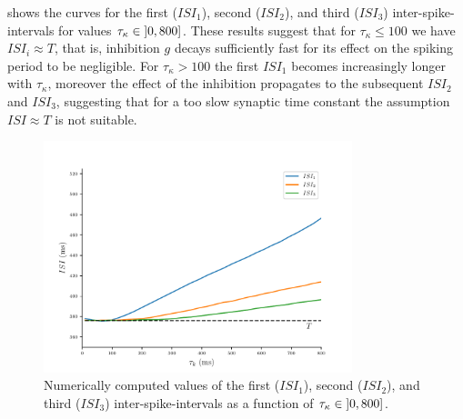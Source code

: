 \documentclass[utf8]{frontiers_suppmat} %
\begin{document}
 shows the curves for the first ($ISI_{1}$), second ($ISI_{2}$), and third ($ISI_{3}$) inter-spike-intervals for values $\tau_{\kappa} \in \interval[open left]{0}{800}$.
These results suggest that for $\tau_\kappa \leq 100$ we have $ISI_i \approx T$, that is, inhibition $g$ decays sufficiently fast for its effect on the spiking period to be negligible.
For $\tau_\kappa > 100$ the first $ISI_{1}$ becomes increasingly longer with $\tau_{\kappa}$, moreover the effect of the inhibition propagates to the subsequent $ISI_{2}$ and $ISI_{3}$, suggesting that for a too slow synaptic time constant the assumption $ISI \approx T$ is not suitable.

\begin{figure}[h!]
	\centering
	\includegraphics[width=0.8\textwidth]{tauk-vs-ISI}
	\caption{Numerically computed values of the first ($ISI_{1}$), second ($ISI_{2}$), and third ($ISI_{3}$) inter-spike-intervals as a function of $\tau_{\kappa} \in \interval[open left]{0}{800}$.~\label{fig:tauk-vs-ISI}}
\end{figure}



\end{document}
